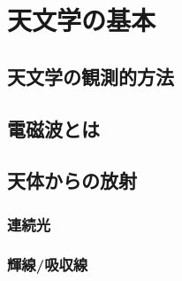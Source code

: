 \chapter{天文学の基本}
\label{chap:fandamentals_of_astronomy}

\section{天文学の観測的方法}

\section{電磁波とは}

\section{天体からの放射}

\subsection{連続光}

\subsection{輝線/吸収線}